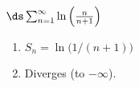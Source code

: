 {$\ds \sum_{n=1}^\infty \ln \left(\frac{n}{n+1}\right)$
}
{\begin{enumerate}
\item	$S_n = \ln \big(1/(n+1)\big)$
\item	Diverges (to $-\infty$).
\end{enumerate}
}
